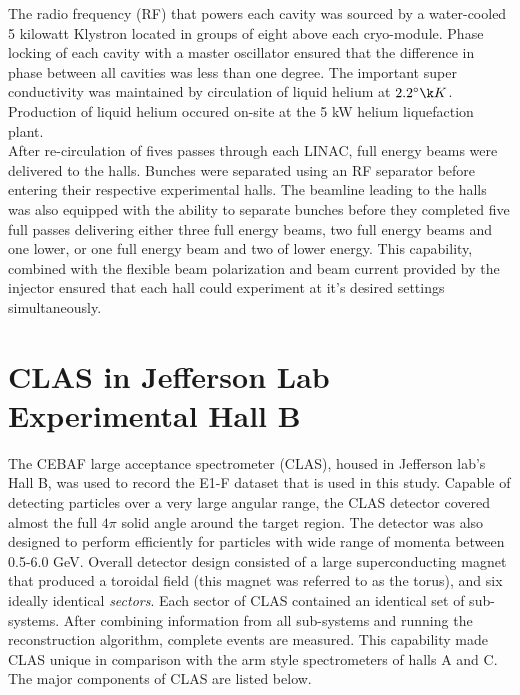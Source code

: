 The radio frequency (RF) that powers each cavity was sourced by a water-cooled 5 kilowatt Klystron located in groups of eight above each cryo-module.  Phase locking of each cavity with a master oscillator ensured that the difference in phase between all cavities was less than one degree. The important super conductivity was maintained by circulation of liquid helium at $2.2^\circ \k K$.  Production of liquid helium occured on-site at the 5 kW helium liquefaction plant.  \\

After re-circulation of fives passes through each LINAC, full energy beams were delivered to the halls.  Bunches were separated using an RF separator before entering their respective experimental halls.  The beamline leading to the halls was also equipped with the ability to separate bunches before they completed five full passes delivering either three full energy beams, two full energy beams and one lower, or one full energy beam and two of lower energy.  This capability, combined with the flexible beam polarization and beam current provided by the injector ensured that each hall could experiment at it's desired settings simultaneously.  

\section{CLAS in Jefferson Lab Experimental Hall B}
The CEBAF large acceptance spectrometer (CLAS), housed in Jefferson lab's Hall B, was used to record the E1-F dataset that is used in this study.  Capable of detecting particles over a very large angular range, the CLAS detector covered almost the full $4\pi$ solid angle around the target region.  The detector was also designed to perform efficiently for particles with wide range of momenta between 0.5-6.0 GeV.  Overall detector design consisted of a large superconducting magnet that produced a toroidal field (this magnet was referred to as the torus), and six ideally identical \textit{sectors}.  Each sector of CLAS contained an identical set of sub-systems.  After combining information from all sub-systems and running the reconstruction algorithm, complete events are measured.  This capability made CLAS unique in comparison with the arm style spectrometers of halls A and C.  The major components of CLAS are listed below.


